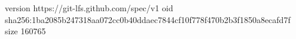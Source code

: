 version https://git-lfs.github.com/spec/v1
oid sha256:1ba2085b247318aa072cc0b40ddaec7844cf10f778f470b2b3f1850a8ecafd7f
size 160765
